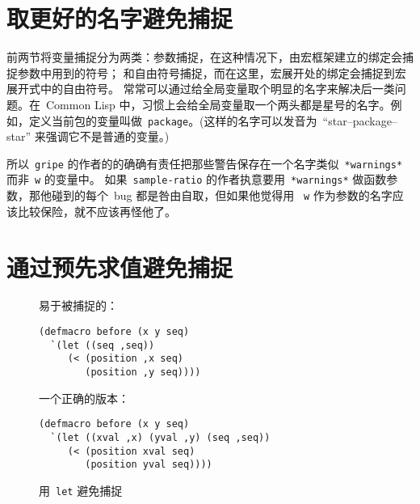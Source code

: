\section{取更好的名字避免捕捉}
\label{sec:avoiding_capture_with_better_names}

前两节将变量捕捉分为两类：参数捕捉，在这种情况下，由宏框架建立的绑定会捕捉参数中用到的符号；
和自由符号捕捉，而在这里，宏展开处的绑定会捕捉到宏展开式中的自由符号。
常常可以通过给全局变量取个明显的名字来解决后一类问题。在~Common Lisp 中，习惯上会给全局变量取一个两头都是星号的名字。例如，定义当前包的变量叫做~\texttt{package}。(这样的名字可以发音为~``star--package--star'' 来强调它不是普通的变量。)

所以~\texttt{gripe} 的作者的的确确有责任把那些警告保存在一个名字类似~\texttt{*warnings*} 而非~\texttt{w} 的变量中。
如果~\texttt{sample-ratio} 的作者执意要用~\texttt{*warnings*} 做函数参数，那他碰到的每个~bug 都是咎由自取，但如果他觉得用
~\texttt{w} 作为参数的名字应该比较保险，就不应该再怪他了。

\section{通过预先求值避免捕捉}
\label{sec:avoiding_capture_by_prior_evaluation}

\begin{figure}
易于被捕捉的：
\begin{lstlisting}
(defmacro before (x y seq)
  `(let ((seq ,seq))
     (< (position ,x seq)
        (position ,y seq))))
\end{lstlisting}
一个正确的版本：
\begin{lstlisting}
(defmacro before (x y seq)
  `(let ((xval ,x) (yval ,y) (seq ,seq))
     (< (position xval seq)
        (position yval seq))))
\end{lstlisting}
\caption{\label{fig:avoiding_capture_with_let}用~\texttt{let} 避免捕捉}
\end{figure}

